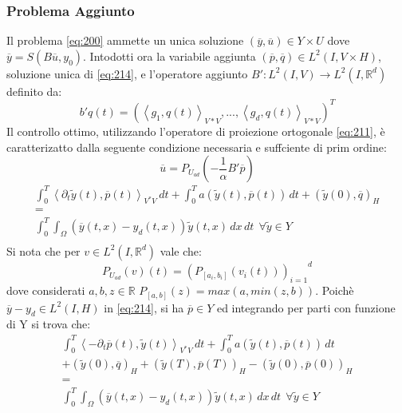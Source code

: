 \subsubsection{Problema Aggiunto}
Il problema \ref{eq:200} ammette un unica soluzione $(\overline{y},\overline{u}){\in}Y{\times}U$ dove $\overline{y}=S(B\overline{u},y_0)$.
Intodotti ora la variabile aggiunta $(\overline{p},\overline{q}) \in L^2(I,V{\times}H)$, soluzione unica di \ref{eq:214}, e l'operatore aggiunto $B':L^2(I,V){\rightarrow}L^2(I,\mathbb{R}^d)$ definito da:
\begin{equation}
b'q(t) = ( \left \langle g_1,q(t) \right \rangle_{V*V}, . . . ,\left \langle g_d,q(t) \right \rangle_{V*V})^T
\label{eq:212}
\end{equation}
Il controllo ottimo, utilizzando l'operatore di proiezione ortogonale \ref{eq:211}, è caratterizatto dalla seguente condizione necessaria e suffciente di prim ordine:
\begin{equation}
\overline{u}=P_{U_{ad}}\left( -\frac{1}{\alpha}B'\overline{p} \right)
\label{eq:213}
\end{equation}
\begin{equation}
\begin{array}{c}
	\int_{0}^{T} \left \langle {\partial_{t}}\tilde{y}(t),\overline{p}(t) \right \rangle_{V^*V} \, dt +  	\int_{0}^{T} a(\tilde{y}(t),\overline{p}(t)) \, dt + (\tilde{y}(0),\overline{q})_H  \\
	 = \\
	\int_{0}^{T} \int_{\Omega} (\overline{y}(t,x)-y_d(t,x))\tilde{y}(t,x) \,dx \, dt  \ \ \forall \tilde{y} \in Y \\
\end{array}
\label{eq:214}
\end{equation}
Si nota che per $v \in L^2(I,\mathbb{R}^d)$ vale che:
\begin{equation}
P_{U_{ad}}(v)(t) = {(P_{[a_i,b_i]}(v_i(t)))_{i=1}}^d
\label{eq:215}
\end{equation}
dove considerati $a,b,z \in \mathbb{R}$ $P_{[a,b]}(z) = max(a,min(z,b))$.
Poichè $\overline{y} - y_d \in L^2(I,H)$ in \ref{eq:214}, si ha $\overline{p} \in Y$ ed integrando per parti con funzione di Y si trova che:
{\renewcommand\arraystretch{2}
\begin{equation}
\begin{array}{c}
	\int_{0}^{T} \left \langle -{\partial_{t}}\overline{p}(t),\tilde{y}(t) \right \rangle_{V^*V} \, dt +  	\int_{0}^{T} a(\tilde{y}(t),\overline{p}(t)) \, dt \\
	+ (\tilde{y}(0),\overline{q})_H + (\tilde{y}(T),\overline{p}(T))_H - (\tilde{y}(0),\overline{p}(0))_H \\
	 = \\
	\int_{0}^{T} \int_{\Omega} (\overline{y}(t,x)-y_d(t,x))\tilde{y}(t,x) \,dx \, dt  \ \ \forall \tilde{y} \in Y \\
\end{array}
\label{eq:216}
\end{equation}
} %
